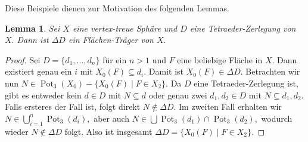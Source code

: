 \documentclass[12pt,titlepage,twoside,cleardoublepage]{article}
\theoremstyle{nummermitklammern}
\newtheorem{lemma}[temp]{Lemma}
\newtheorem{lemma}[zahl]{Lemma}
\numberwithin{equation}{section}
\DeclareMathOperator{\Pot}{Pot}
\begin{document}
Diese Beispiele dienen zur Motivation des folgenden Lemmas.
\begin{lemma}
Sei $X$ eine vertex-treue Sphäre und $D$ eine Tetraeder-Zerlegung von $X.$ Dann ist $\Delta D$ ein Flächen-Träger von $X.$
\end{lemma}
\begin{proof}
Sei $D=\{d_1,\ldots,d_n\}$ für ein $n>1$
und $F$ eine beliebige Fläche in $X.$ Dann existiert genau ein $i$ mit $X_0(F)\subseteq d_i.$ Damit ist $X_0(F) \in \Delta D.$ Betrachten wir nun $N\in \Pot_3(X_0)-\{X_0(F)\mid F\in X_2\}.$ Da $D$ eine Tetraeder-Zerlegung ist, gibt es entweder kein $d\in D$ mit $N\subseteq d$ oder genau zwei $d_1,d_2\in D$ mit $N\subseteq d_1,d_2.$ Falls ersteres der Fall ist, folgt direkt $N\notin \Delta D.$ Im zweiten Fall erhalten wir $N\in \bigcup_{i=1}^n \Pot_3(d_i),$ aber auch $N\in \bigcup \Pot_3(d_1)\cap \Pot_3(d_2),$ wodurch wieder $N\notin \Delta D$ folgt. 
Also ist insgesamt $\Delta D=\{X_0(F)\mid F\in X_2\}.$ 
\end{proof}
\end{document}
